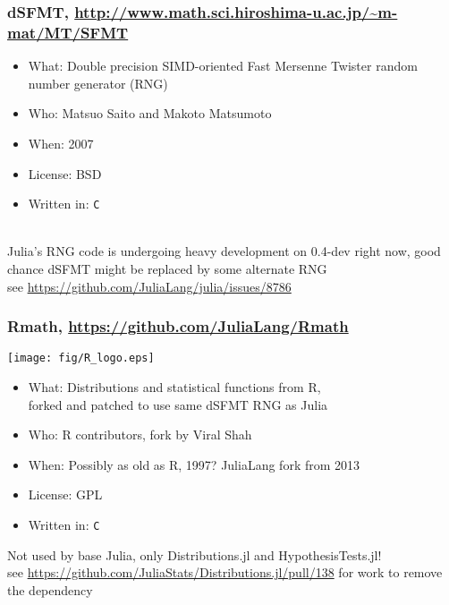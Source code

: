 \documentclass[compressed,dvips,letter]{beamer}
\begin{document}
\begin{frame}\frametitle{dSFMT, {\small \url{http://www.math.sci.hiroshima-u.ac.jp/~m-mat/MT/SFMT}}}

\begin{itemize}
\item What: Double precision SIMD-oriented Fast Mersenne Twister random number generator (RNG)
\item Who: Matsuo Saito and Makoto Matsumoto
\item When: 2007
\item License: BSD
\item Written in: \texttt{C}
\end{itemize}

~\\
Julia's RNG code is undergoing heavy development on 0.4-dev right now, good chance dSFMT might be replaced by some alternate RNG \\
see \url{https://github.com/JuliaLang/julia/issues/8786}

\end{frame}

%
%

\begin{frame}\frametitle{Rmath, \url{https://github.com/JuliaLang/Rmath}}

\begin{center}
\texttt{[image: fig/R\_logo.eps]}
\end{center}
\vspace{-15pt}
\begin{itemize}
\item What: Distributions and statistical functions from R, \\
forked and patched to use same dSFMT RNG as Julia
\item Who: R contributors, fork by Viral Shah
\item When: Possibly as old as R, 1997? JuliaLang fork from 2013
\item License: GPL
\item Written in: \texttt{C}
\end{itemize}

Not used by base Julia, only Distributions.jl and HypothesisTests.jl! \\
see \url{https://github.com/JuliaStats/Distributions.jl/pull/138} for work to remove the dependency

\end{frame}
\end{document}
